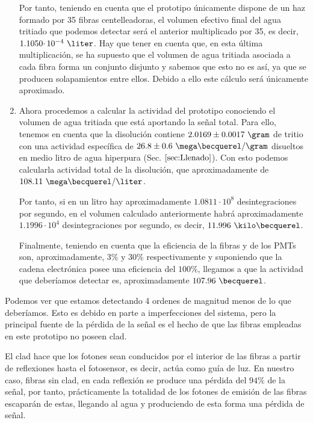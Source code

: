 \begin{enumerate}
Por tanto, teniendo en cuenta que el prototipo únicamente dispone de un haz formado por 35 fibras centelleadoras, el volumen efectivo final del agua tritiado que podemos detectar será el anterior multiplicado por 35, es decir, $1.1050 \cdotp 10^{-4}~\liter$. Hay que tener en cuenta que, en esta última multiplicación, se ha supuesto que el volumen de agua tritiada asociada a cada fibra forma un conjunto disjunto y sabemos que esto no es así, ya que se producen solapamientos entre ellos. Debido a ello este cálculo será únicamente aproximado.

\item{} Ahora procedemos a calcular la actividad del prototipo conociendo el volumen de agua tritiada que está aportando  la señal total. Para ello, tenemos en cuenta que la disolución contiene $2.0169 \pm 0.0017~\gram$ de tritio con una actividad específica de $26.8 \pm 0.6~\mega\becquerel/\gram$ disueltos en medio litro de agua hiperpura (Sec. $\ref{sec:Llenado}$). Con esto podemos calcularla actividad total de la disolución, que aproximadamente de $108.11~\mega\becquerel/\liter$. 

Por tanto, si en un litro hay aproximadamente $1.0811\cdotp 10^{8}$ desintegraciones por segundo, en el volumen calculado anteriormente habrá aproximadamente $1.1996\cdotp 10^{4}$ desintegraciones por segundo, es decir, $11.996~\kilo\becquerel$.

Finalmente, teniendo en cuenta que la eficiencia de la fibras y de los PMTs son, aproximadamente, 3\% y 30\% respectivamente y suponiendo que la cadena electrónica posee una eficiencia del $100\%$, llegamos a que la actividad que deberíamos detectar es, aproximadamente $107.96~\becquerel$.

\end{enumerate}

Podemos ver que estamos detectando 4 ordenes de magnitud menos de lo que deberíamos. Esto es debido en parte a imperfecciones del sistema, pero la principal fuente de la pérdida de la señal es  el hecho de que las fibras empleadas en este prototipo no poseen clad. 

El clad hace que los fotones sean conducidos por el interior de las fibras a partir de reflexiones hasta el fotosensor, es decir, actúa como guía de luz. En nuestro caso, fibras sin clad, en cada reflexión se produce una pérdida del $94\%$ de la señal, por tanto, prácticamente la totalidad de los fotones de emisión de las fibras escaparán de estas, llegando al agua y produciendo de esta forma una pérdida de señal. 

